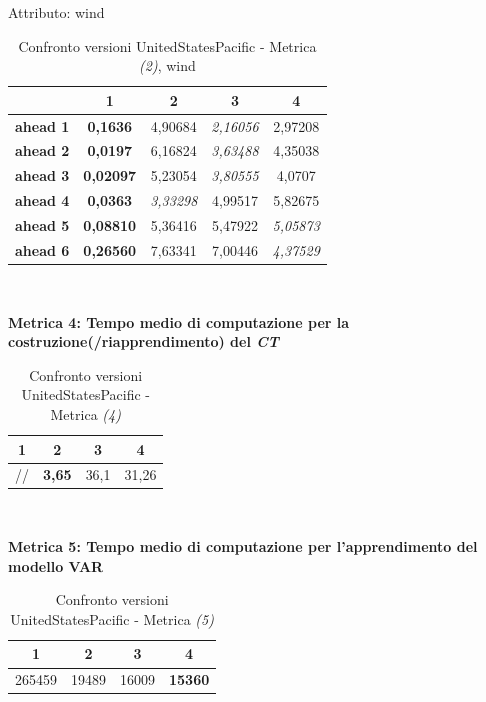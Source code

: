 \documentclass[12pt,a4paper,oneside,openright]{book}
\begin{document}
\medskip

Attributo: wind \\ 

\begin{table}[H]
\centering
\begin{tabular}{|c|c|c|c|c|}
\hline
& 1 & 2 & 3 & 4 \\
\hline
\textbf{ahead 1} & \textbf{0,1636} & 4,90684 & \textit{2,16056} & 2,97208\\
\hline
\textbf{ahead 2} & \textbf{0,0197} & 6,16824 & \textit{3,63488} & 4,35038\\
\hline
\textbf{ahead 3} & \textbf{0,02097} & 5,23054 & \textit{3,80555} & 4,0707\\
\hline
\textbf{ahead 4} & \textbf{0,0363} & \textit{3,33298} & 4,99517 & 5,82675\\
\hline
\textbf{ahead 5} & \textbf{0,08810} & 5,36416 & 5,47922 & \textit{5,05873}\\
\hline
\textbf{ahead 6} & \textbf{0,26560} & 7,63341 & 7,00446 & \textit{4,37529}\\
\hline
\end{tabular} \\
\caption{Confronto versioni UnitedStatesPacific - Metrica \textit{(2)}, wind}
\end{table} 

\medskip

\textbf{Metrica 4: Tempo medio di computazione per la costruzione(/riapprendimento) del \textit{CT}}

\medskip

\begin{table}[H]
\centering
\begin{tabular}[H]{|c|c|c|c|}
\hline
1 & 2 & 3 & 4\\
\hline
// & \textbf{3,65} & 36,1 & 31,26\\ 
\hline
\end{tabular} \\
\caption{Confronto versioni UnitedStatesPacific - Metrica \textit{(4)}}
\end{table}

\medskip

\textbf{Metrica 5: Tempo medio di computazione per l'apprendimento del modello VAR}

\medskip

\begin{table}[H]
\centering
\begin{tabular}[H]{|c|c|c|c|}
\hline
1 & 2 & 3 & 4\\
\hline
265459 & 19489 & 16009 & \textbf{15360}\\ 
\hline
\end{tabular} \\
\caption{Confronto versioni UnitedStatesPacific - Metrica \textit{(5)}}
\end{table}
\end{document}
